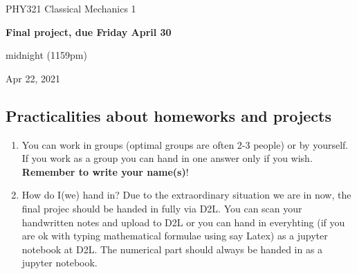 \documentclass[%
oneside,                 %
final,                   %
10pt]{article}
\begin{document}

\newcommand{\exercisesection}[1]{\subsection*{#1}}






\thispagestyle{empty}

\begin{center}
{\LARGE\bf
\begin{spacing}{1.25}
PHY321 Classical Mechanics 1
\end{spacing}
}
\end{center}


\begin{center}
{\bf Final  project, due Friday April 30}
\end{center}

    \begin{center}
\centerline{{\small midnight (1159pm)}}
\end{center}
    

\begin{center}
Apr 22, 2021
\end{center}

\vspace{1cm}


\subsection{Practicalities about  homeworks and projects}

\begin{enumerate}
\item You can work in groups (optimal groups are often 2-3 people) or by yourself. If you work as a group you can hand in one answer only if you wish. \textbf{Remember to write your name(s)}!

\item How do I(we)  hand in?  Due to the extraordinary situation we are in now, the final projec should be handed in fully via D2L. You can scan your handwritten notes and upload to D2L or you can hand in everyhting (if you are ok with typing mathematical formulae using say Latex) as a jupyter notebook at D2L. The numerical part should always be handed in as a jupyter notebook.
\end{enumerate}
\end{document}

